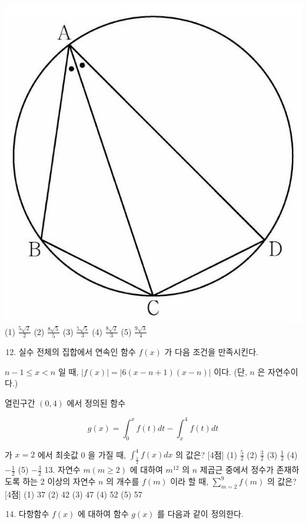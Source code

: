 \documentclass[10pt]{article}
\begin{document}
\includegraphics[max width=\textwidth, center]{2023_05_19_a9cef858603f6abf5411g-24}
(1) $\frac{5 \sqrt{2}}{2}$
(2) $\frac{8 \sqrt{5}}{5}$
(3) $\frac{5 \sqrt{5}}{3}$
(4) $\frac{8 \sqrt{2}}{3}$
(5) $\frac{9 \sqrt{3}}{4}$

\begin{enumerate}
  \setcounter{enumi}{11}
  \item 실수 전체의 집합에서 연속인 함수 $f(x)$ 가 다음 조건을 만족시킨다.
\end{enumerate}

$n-1 \leq x<n$ 일 때, $|f(x)|=|6(x-n+1)(x-n)|$ 이다. (단, $n$ 은 자연수이다.)

열린구간 $(0,4)$ 에서 정의된 함수

$$
g(x)=\int_{0}^{x} f(t) d t-\int_{x}^{4} f(t) d t
$$

가 $x=2$ 에서 최솟값 0 을 가질 때, $\int_{\frac{1}{2}}^{4} f(x) d x$ 의 값은? [4점]
(1) $\frac{5}{2}$
(2) $\frac{3}{2}$
(3) $\frac{1}{2}$
(4) $-\frac{1}{2}$
(5) $-\frac{3}{2}$ 13. 자연수 $m(m \geq 2)$ 에 대하여 $m^{12}$ 의 $n$ 제곱근 중에서 정수가 존재하도록 하는 2 이상의 자연수 $n$ 의 개수를 $f(m)$ 이라 할 때, $\sum_{m=2}^{9} f(m)$ 의 값은? [4점]
(1) 37
(2) 42
(3) 47
(4) 52
(5) 57

\begin{enumerate}
  \setcounter{enumi}{13}
  \item 다항함수 $f(x)$ 에 대하여 함수 $g(x)$ 를 다음과 같이 정의한다.
\end{enumerate}
\end{document}
